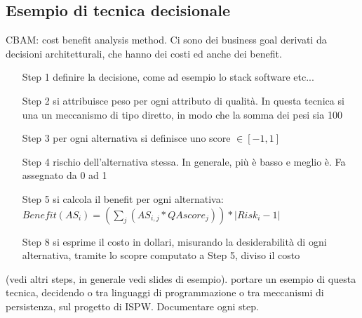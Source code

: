 \documentclass{article}
\begin{document}
\subsection{Esempio di tecnica decisionale}
CBAM: cost benefit analysis method. Ci sono dei business goal derivati da decisioni architetturali, che hanno dei costi ed anche dei benefit.
\begin{enumerate}
\item[Step 1] definire la decisione, come ad esempio lo stack software etc...
\item[Step 2] si attribuisce peso per ogni attributo di qualità. In questa tecnica si una un meccanismo di tipo diretto, in modo che la somma dei pesi sia 100
\item[Step 3] per ogni alternativa si definisce uno score $\in [-1,1]$
\item[Step 4] rischio dell'alternativa stessa. In generale, più è basso e meglio è. Fa assegnato da 0 ad 1
\item[Step 5] si calcola il benefit per ogni alternativa: $Benefit(AS_i) = (\sum\limits_{j}(AS_{i,j} *QAscore_j)) * |Risk_i - 1|$
\item[Step 8] si esprime il costo in dollari, misurando la desiderabilità di ogni alternativa, tramite lo scopre computato a Step 5, diviso il costo
\end{enumerate}
(vedi altri steps, in generale vedi slides di esempio).
portare un esempio di questa tecnica, decidendo o tra linguaggi di programmazione o tra meccanismi di persistenza, sul progetto di ISPW. Documentare ogni step.
\end{document}
